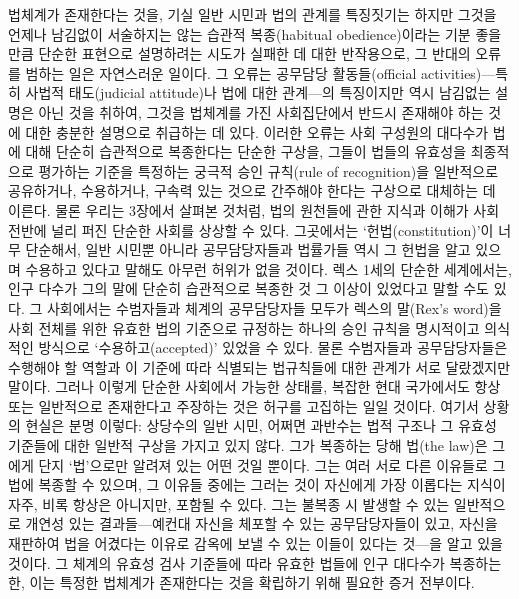 법체계가 존재한다는 것을, 기실 일반 시민과 법의 관계를 특징짓기는 하지만
그것을 언제나 남김없이 서술하지는 않는 습관적 복종(habitual
obedience)이라는 기분 좋을 만큼 단순한 표현으로 설명하려는 시도가 실패한
데 대한 반작용으로, 그 반대의 오류를 범하는 일은 자연스러운 일이다. 그
오류는 공무담당 활동들(official activities)---특히 사법적 태도(judicial
attitude)나 법에 대한 관계---의 특징이지만 역시 남김없는 설명은 아닌
것을 취하여, 그것을 법체계를 가진 사회집단에서 반드시 존재해야 하는 것에
대한 충분한 설명으로 취급하는 데 있다. 이러한 오류는 사회 구성원의
대다수가 법에 대해 단순히 습관적으로 복종한다는 단순한 구상을, 그들이
법들의 유효성을 최종적으로 평가하는 기준을 특정하는 궁극적 승인
규칙(rule of recognition)을 일반적으로 공유하거나, 수용하거나, 구속력
있는 것으로 간주해야 한다는 구상으로 대체하는 데 이른다. 물론 우리는
3장에서 살펴본 것처럼, 법의 원천들에 관한 지식과 이해가 사회 전반에 널리
퍼진 단순한 사회를 상상할 수 있다. 그곳에서는 ‘헌법(constitution)’이
너무 단순해서, 일반 시민뿐 아니라 공무담당자들과 법률가들 역시 그 헌법을
알고 있으며 수용하고 있다고 말해도 아무런 허위가 없을 것이다. 렉스 1세의
단순한 세계에서는, 인구 다수가 그의 말에 단순히 습관적으로 복종한 것 그
이상이 있었다고 말할 수도 있다. 그 사회에서는 수범자들과 체계의
공무담당자들 모두가 렉스의 말(Rex's word)을 사회 전체를 위한 유효한 법의
기준으로 규정하는 하나의 승인 규칙을 명시적이고 의식적인 방식으로
‘수용하고(accepted)’ 있었을 수 있다. 물론 수범자들과 공무담당자들은
수행해야 할 역할과 이 기준에 따라 식별되는 법규칙들에 대한 관계가 서로
달랐겠지만 말이다. 그러나 이렇게 단순한 사회에서 가능한 상태를, 복잡한
현대 국가에서도 항상 또는 일반적으로 존재한다고 주장하는 것은 허구를
고집하는 일일 것이다. 여기서 상황의 현실은 분명 이렇다: 상당수의 일반
시민, 어쩌면 과반수는 법적 구조나 그 유효성 기준들에 대한 일반적 구상을
가지고 있지 않다. 그가 복종하는 당해 법(the law)은 그에게 단지
‘법’으로만 알려져 있는 어떤 것일 뿐이다. 그는 여러 서로 다른 이유들로 그
법에 복종할 수 있으며, 그 이유들 중에는 그러는 것이 자신에게 가장
이롭다는 지식이 자주, 비록 항상은 아니지만, 포함될 수 있다. 그는 불복종
시 발생할 수 있는 일반적으로 개연성 있는 결과들---예컨대 자신을 체포할
수 있는 공무담당자들이 있고, 자신을 재판하여 법을 어겼다는 이유로 감옥에
보낼 수 있는 이들이 있다는 것---을 알고 있을 것이다. 그 체계의 유효성
검사 기준들에 따라 유효한 법들에 인구 대다수가 복종하는 한, 이는 특정한
법체계가 존재한다는 것을 확립하기 위해 필요한 증거 전부이다.

